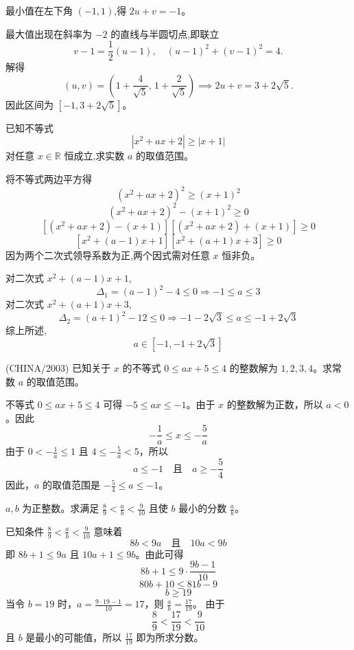 \begin{questions}
\begin{solution}
        最小值在左下角 $(-1,1)$,得 $2u+v = -1$。

        最大值出现在斜率为 $-2$ 的直线与半圆切点,即联立
        \[
        v-1 = \frac{1}{2}(u-1), \quad (u-1)^2 + (v-1)^2 = 4.
        \]
        解得
        \[
        (u,v) = \left(1+\frac{4}{\sqrt{5}},\,1+\frac{2}{\sqrt{5}}\right) \implies 2u+v = 3 + 2\sqrt{5}.
        \]
        因此区间为 $[-1, 3+2\sqrt{5}]$。
    \end{solution}

    \question 已知不等式 
    \[
    |x^2 + ax + 2| \ge |x + 1|
    \]
    对任意 $x \in \mathbb{R}$ 恒成立,求实数 $a$ 的取值范围。
    \begin{solution}
        将不等式两边平方得
        \[
        (x^2 + ax + 2)^2 \ge (x + 1)^2
        \]
        \[
        (x^2 + ax + 2)^2 - (x + 1)^2 \ge 0
        \]
        \[
        [(x^2 + ax + 2) - (x + 1)][(x^2 + ax + 2) + (x + 1)] \ge 0
        \]
        \[
        [x^2 + (a - 1)x + 1][x^2 + (a + 1)x + 3] \ge 0
        \]
        因为两个二次式领导系数为正,两个因式需对任意 $x$ 恒非负。
        
        对二次式 $x^2 + (a - 1)x + 1$,
        \[
        \Delta_1  = (a - 1)^2 - 4 \le 0
        \Rightarrow -1 \le a \le 3
        \]
        对二次式 $x^2 + (a + 1)x + 3$,
        \[
        \Delta_2  = (a + 1)^2 - 12 \le 0
        \Rightarrow -1 - 2\sqrt{3} \le a \le -1 + 2\sqrt{3}
        \]
        综上所述,
        \[
        a \in [-1, -1 + 2\sqrt{3}]
        \]
    \end{solution}

    \question (CHINA/2003) 已知关于 $x$ 的不等式 $0 \le ax+5 \le 4$ 的整数解为 $1, 2, 3, 4$。求常数 $a$ 的取值范围。

\begin{solution}
不等式 $0 \le ax+5 \le 4$ 可得 $-5 \le ax \le -1$。由于 $x$ 的整数解为正数，所以 $a < 0$。因此
\[
-\frac{1}{a} \le x \le -\frac{5}{a}
\]
由于 $0 < -\frac{1}{a} \le 1$ 且 $4 \le -\frac{5}{a} < 5$，所以
\[
a \le -1 \quad \text{且} \quad a \ge -\frac{5}{4}
\]
因此，$a$ 的取值范围是 $-\frac{5}{4} \le a \le -1$。
\end{solution}

\question $a, b$ 为正整数。求满足 $\frac{8}{9} < \frac{a}{b} < \frac{9}{10}$ 且使 $b$ 最小的分数 $\frac{a}{b}$。

\begin{solution}
已知条件 $\frac{8}{9} < \frac{a}{b} < \frac{9}{10}$ 意味着
\[
8b < 9a \quad \text{且} \quad 10a < 9b
\]
即 $8b+1 \le 9a$ 且 $10a+1 \le 9b$。由此可得
\[
8b+1 \le 9 \cdot \frac{9b-1}{10}
\]
\[
80b+10 \le 81b-9
\]
\[
b \ge 19
\]
当令 $b=19$ 时，$a = \frac{9 \cdot 19-1}{10} = 17$，则 $\frac{a}{b} = \frac{17}{19}$。
由于
\[
\frac{8}{9} < \frac{17}{19} < \frac{9}{10}
\]
且 $b$ 是最小的可能值，所以 $\frac{17}{19}$ 即为所求分数。
\end{solution}


\end{questions}
